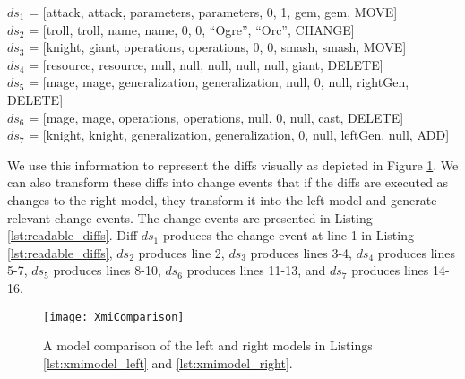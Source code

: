 $ds_{1}$ =  [\textsf{attack}, \textsf{attack}, \textsf{parameters}, \textsf{parameters}, 0, 1, \textsf{gem}, \textsf{gem}, \textsf{MOVE}]\\
$ds_{2}$ = [\textsf{troll}, \textsf{troll}, \textsf{name}, \textsf{name}, 0, 0, ``Ogre'', ``Orc'', \textsf{CHANGE}]\\
$ds_{3}$ = [\textsf{knight}, \textsf{giant}, \textsf{operations}, \textsf{operations}, 0, 0, \textsf{smash}, \textsf{smash}, \textsf{MOVE}]\\
$ds_{4}$ = [\textsf{resource}, \textsf{resource}, \textsf{null}, \textsf{null}, \textsf{null}, \textsf{null}, \textsf{null}, \textsf{giant}, \textsf{DELETE}]\\
$ds_{5}$ = [\textsf{mage}, \textsf{mage}, \textsf{generalization}, \textsf{generalization}, \textsf{null}, 0, \textsf{null}, \textsf{rightGen}, \textsf{DELETE}] \\
$ds_{6}$ = [\textsf{mage}, \textsf{mage}, \textsf{operations}, \textsf{operations}, \textsf{null}, 0, \textsf{null}, \textsf{cast}, \textsf{DELETE}]\\
$ds_{7}$ = [\textsf{knight}, \textsf{knight}, \textsf{generalization}, \textsf{generalization}, 0, \textsf{null}, \textsf{leftGen}, \textsf{null}, \textsf{ADD}]

We use this information to represent the diffs visually as depicted in Figure \ref{fig:xmi_comparison}. We can also transform these diffs into change events that if the diffs are executed as changes to the right model, they transform it into the left model and generate relevant change events. The change events are presented in Listing \ref{lst:readable_diffs}. Diff $ds_{1}$ produces the change event at line 1 in Listing \ref{lst:readable_diffs}, $ds_{2}$ produces line 2, $ds_{3}$ produces lines 3-4, $ds_{4}$ produces lines 5-7, $ds_{5}$ produces lines 8-10, $ds_{6}$ produces lines 11-13, and $ds_{7}$ produces lines 14-16.

\begin{figure}[ht]
  \texttt{[image: XmiComparison]}
  \caption{A model comparison of the left and right models in Listings \ref{lst:xmimodel_left} and \ref{lst:xmimodel_right}.}
  \label{fig:xmi_comparison}
\end{figure}

